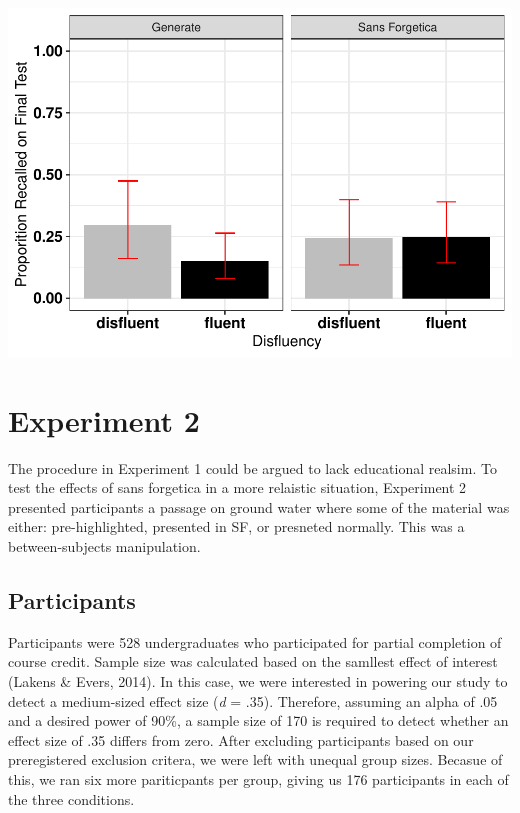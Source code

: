 \documentclass[pdf]{apa6}
\begin{document}
\includegraphics{SF_Paper_files/figure-latex/unnamed-chunk-1-1.pdf}

\hypertarget{experiment-2}{%
\section{Experiment 2}\label{experiment-2}}

The procedure in Experiment 1 could be argued to lack educational realsim. To test the effects of sans forgetica in a more relaistic situation, Experiment 2 presented participants a passage on ground water where some of the material was either: pre-highlighted, presented in SF, or presneted normally. This was a between-subjects manipulation.

\hypertarget{participants-1}{%
\subsection{Participants}\label{participants-1}}

Participants were 528 undergraduates who participated for partial completion of course credit. Sample size was calculated based on the samllest effect of interest (Lakens \& Evers, 2014). In this case, we were interested in powering our study to detect a medium-sized effect size (\emph{d} = .35). Therefore, assuming an alpha of .05 and a desired power of 90\%, a sample size of 170 is required to detect whether an effect size of .35 differs from zero. After excluding participants based on our preregistered exclusion critera, we were left with unequal group sizes. Becasue of this, we ran six more pariticpants per group, giving us 176 participants in each of the three conditions.
\end{document}
